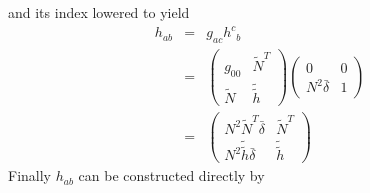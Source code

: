 and its index lowered to yield
\begin{eqnarray*}
   h_{ab} & = &  g_{a c} {h^{c}}_{b}  \\
             & = & \left(
                      \begin{array}{cc}
                         g_{00}   & {\tilde N}^T \\
                         \tilde N & {\tilde {\tilde h}}
                      \end{array}
                   \right)
                   \left(
                      \begin{array}{cc}
                         0               & 0 \\
                         N^2 \bar \delta & 1
                      \end{array}
                   \right) \\
             & = & \left(
                      \begin{array}{cc}
                         N^2 {\tilde N}^T \bar \delta & {\tilde N}^T \\
                         N^2 {\tilde {\tilde h}} \bar \delta & {\tilde {\tilde h}}
                      \end{array}
                   \right)
\end{eqnarray*}
Finally $h_{ab}$ can be constructed directly by
